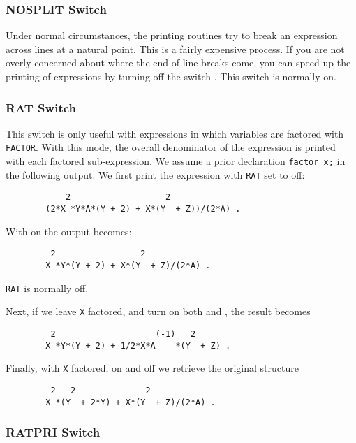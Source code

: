 \subsubsection{NOSPLIT Switch}
\hypertarget{switch:NOSPLIT}{}

Under normal circumstances, the printing routines try to break an expression
across lines at a natural point.  This is a fairly expensive process.  If
you are not overly concerned about where the end-of-line breaks come, you
can speed up the printing of expressions by turning off the switch
.  This switch is normally on.

\subsubsection{RAT Switch}
\hypertarget{switch:RAT}{}

This switch is only useful with expressions in which variables are
factored with \texttt{FACTOR}. With this mode, the overall denominator of the
expression is printed with each factored sub-expression. We assume a prior
declaration \texttt{factor x;} in the following output. We first print the
expression with \texttt{RAT} set to off:
\begin{verbatim}
            2                   2
        (2*X *Y*A*(Y + 2) + X*(Y  + Z))/(2*A) .
\end{verbatim}
With  on the output becomes:
\begin{verbatim}
         2                 2
        X *Y*(Y + 2) + X*(Y  + Z)/(2*A) .
\end{verbatim}
\texttt{RAT} is normally off.

Next, if we leave \texttt{X} factored, and turn on both  and
, the result becomes
\begin{verbatim}
         2                    (-1)   2
        X *Y*(Y + 2) + 1/2*X*A    *(Y  + Z) .
\end{verbatim}
Finally, with \texttt{X} factored,  on and 
off we retrieve the original structure
\begin{verbatim}
         2   2              2
        X *(Y  + 2*Y) + X*(Y  + Z)/(2*A) .
\end{verbatim}

\subsubsection{RATPRI Switch}
\hypertarget{switch:RATPRI}{}

